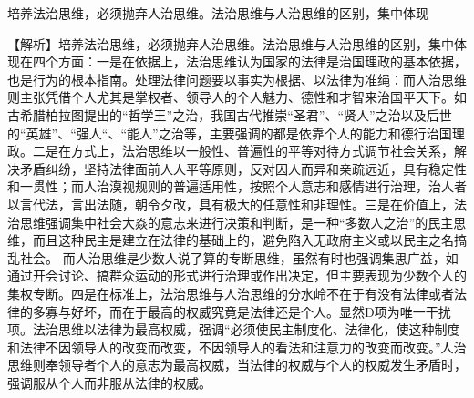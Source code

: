 \question 培养法治思维，必须抛弃人治思维。法治思维与人治思维的区别，集中体现
\par{}
\begin{solution}【解析】培养法治思维，必须抛弃人治思维。法治思维与人治思维的区别，集中体现在四个方面：一是在依据上，法治思维认为国家的法律是治国理政的基本依据，也是行为的根本指南。处理法律问题要以事实为根据、以法律为准绳：而人治思维则主张凭借个人尤其是掌权者、领导人的个人魅力、德性和才智来治国平天下。如古希腊柏拉图提出的``哲学王''之治，我国古代推崇``圣君''、``贤人''之治以及后世的``英雄''、``强人``、``能人''之治等，主要强调的都是依靠个人的能力和德行治国理政。二是在方式上，法治思维以一般性、普遍性的平等对待方式调节社会关系，解决矛盾纠纷，坚持法律面前人人平等原则，反对因人而异和亲疏远近，具有稳定性和一贯性；而人治漠视规则的普遍适用性，按照个人意志和感情进行治理，治人者以言代法，言出法随，朝令夕改，具有极大的任意性和非理性。三是在价值上，法治思维强调集中社会大焱的意志来进行决策和判断，是一种``多数人之治''的民主思维，而且这种民主是建立在法律的基础上的，避免陷入无政府主义或以民主之名搞乱社会。
而人治思维是少数人说了算的专断思维，虽然有时也强调集思广益，如通过开会讨论、搞群众运动的形式进行治理或作出决定，但主要表现为少数个人的集权专断。四是在标准上，法治思维与人治思维的分水岭不在于有没有法律或者法律的多寡与好坏，而在于最高的权威究竟是法律还是个人。显然D项为唯一干扰项。法治思维以法律为最高权威，强调``必须使民主制度化、法律化，使这种制度和法律不因领导人的改变而改变，不因领导人的看法和注意力的改变而改变。''人治思维则奉领导者个人的意志为最高权威，当法律的权威与个人的权威发生矛盾时，强调服从个人而非服从法律的权威。
\end{solution}
